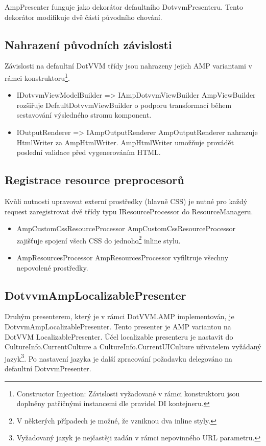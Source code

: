 AmpPresenter funguje jako dekorátor defaultního DotvvmPresenteru. Tento dekorátor modifikuje dvě části původního chování.

\subsection*{Nahrazení původních závislosti}
Závislosti na defaultní DotVVM třídy jsou nahrazeny jejich AMP variantami v rámci konstruktoru\footnote{Constructor Injection: Závislosti vyžadované v rámci konstruktoru jsou doplněny patřičnými instancemi dle pravidel DI kontejneru.}.

\begin{itemize}
    \item IDotvvmViewModelBuilder => IAmpDotvvmViewBuilder \newline
    AmpViewBuilder rozšiřuje DefaultDotvvmViewBuilder o podporu transformací během sestavování výsledného stromu komponent.
    \item IOutputRenderer => IAmpOutputRenderer \newline
    AmpOutputRenderer nahrazuje HtmlWriter za AmpHtmlWriter. AmpHtmlWriter umožňuje provádět poslední validace před vygenerováním HTML.
\end{itemize}

\subsection*{Registrace resource preprocesorů}
Kvůli nutnosti upravovat externí prostředky (hlavně CSS) je nutné pro každý request zaregistrovat dvě třídy typu IResourceProcessor do ResourceManageru.
\begin{itemize}
    \item AmpCustomCssResourceProcessor \newline
    AmpCustomCssResourceProcessor zajišťuje spojení všech CSS do jednoho\footnote{V některých případech je možné, že vzniknou dva inline styly.} inline stylu.
    \item AmpResourcesProcessor \newline
    AmpResourcesProcessor vyfiltruje všechny nepovolené prostředky.
\end{itemize}

\subsection*{DotvvmAmpLocalizablePresenter}
Druhým presenterem, který je v rámci DotVVM.AMP implementován, je DotvvmAmpLocalizablePresenter. Tento presenter je AMP variantou na DotVVM LocalizablePresenter.
Účel localizable presenteru je nastavit do  CultureInfo.CurrentCulture a CultureInfo.CurrentUICulture uživatelem vyžádaný jazyk\footnote{Vyžadovaný jazyk je nejčastěji zadán v rámci nepovinného URL parametru.}. Po nastavení jazyka je další zpracování požadavku delegováno na defaultní DotvvmPresenter.

